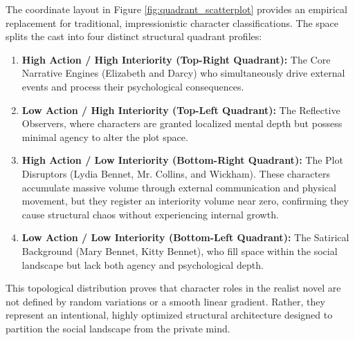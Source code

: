The coordinate layout in Figure \ref{fig:quadrant_scatterplot} provides an empirical replacement for traditional, impressionistic character classifications. The space splits the cast into four distinct structural quadrant profiles:
\begin{enumerate}
    \item \textbf{High Action / High Interiority (Top-Right Quadrant):} The Core Narrative Engines (Elizabeth and Darcy) who simultaneously drive external events and process their psychological consequences.
    \item \textbf{Low Action / High Interiority (Top-Left Quadrant):} The Reflective Observers, where characters are granted localized mental depth but possess minimal agency to alter the plot space.
    \item \textbf{High Action / Low Interiority (Bottom-Right Quadrant):} The Plot Disruptors (Lydia Bennet, Mr. Collins, and Wickham). These characters accumulate massive volume through external communication and physical movement, but they register an interiority volume near zero, confirming they cause structural chaos without experiencing internal growth.
    \item \textbf{Low Action / Low Interiority (Bottom-Left Quadrant):} The Satirical Background (Mary Bennet, Kitty Bennet), who fill space within the social landscape but lack both agency and psychological depth.
\end{enumerate}

This topological distribution proves that character roles in the realist novel are not defined by random variations or a smooth linear gradient. Rather, they represent an intentional, highly optimized structural architecture designed to partition the social landscape from the private mind.
